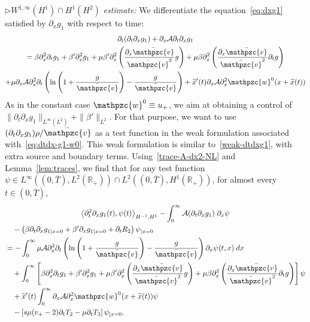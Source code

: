 \documentclass[AHL,Unicode,longabstracts,published]{cedram}
\newcommand{\R}{\mathbb{R}}
\newcommand{\p}{\partial}
\newcommand{\bv}{\bar{\mathpzc{v}}}
\newcommand{\cA}{\mathcal A}
\newcommand{\tw}{\mathpzc{w}}
\newcommand{\tx}{\widetilde{x}}
\newcommand{\tx}{\widetilde{x}}
\begin{document}
$\rhd W^{1,\infty}(H^1)\cap H^1(H^2)$ \emph{estimate:} We differentiate the equation~\eqref{eq:dxg1} satisfied by $\partial_x g_1$ with respect to time:
\begin{multline}\label{eq:dtdx-g1-w0}
\partial_t (\partial_t \partial_x g_1) + \partial_x \cA \partial_t \partial_x g_1 \\
= \beta \partial^2_x \partial_t g_1 + \beta'\partial^2_x g_1 + \mu \beta' \partial^2_x \left(\dfrac{\partial_x \bv}{\bv^2} g\right) + \mu \beta \partial^2_x \left(\dfrac{\partial_x \bv}{\bv^2} \partial_t g\right) \\
 + \mu \partial_x \cA \partial_x^2 \partial_t \left(\ln \left(1+ \dfrac{g}{\bv}\right) - \dfrac{g}{\bv} \right) + \tx'(t) \partial_x \cA \partial^2_x \tw^0(x + \tx(t))
\end{multline}
As in the constant case $\tw^0 \equiv u_+$, we aim at obtaining a control of $\|\partial_t \partial_x g_1\|_{L^\infty(L^2)} + \|\beta'\|_{L^2}$. For that purpose, we want to use $(\partial_t \partial_x g_1) \rho/\bv$ as a test function in the weak formulation associated with~\eqref{eq:dtdx-g1-w0}. This weak formulation is similar to~\eqref{weak-dtdxg1}, with extra source and boundary terms. Using~\eqref{trace-A-dx2-NL} and Lemma~\ref{lem:traces}, we find that for any test function $\psi\in L^\infty((0,\overline{T}), L^2(\R_+))\cap L^2((0,\overline{T}), H^1(\R_+))$, for almost every $t\in (0,\overline{T})$,
\begin{multline*}
\left\langle \p_t^2 \p_x g_1(t), \psi(t)\right\rangle_{H^{-1}, H^1} -\int_0^\infty \cA(\p_t\p_x g_1)\; \p_x \psi
\\
\begin{aligned}
&\quad -\left(\beta\p_t\p_x g_{1|x=0} + \beta' \p_xg_{1|x=0} + \p_t R_2\right)\psi_{|x=0}\\
&=-\int_0^\infty \mu \cA \p_x^2 \p_t \left(\ln \left(1+ \dfrac{g}{\bv}\right) - \dfrac{g}{\bv} \right) \p_x \psi(t,x)\:dx \\
&\quad +\int_0^\infty \left[\beta \p_x^2\p_t g_1 + \beta'\partial^2_x g_1 + \mu \beta' \partial^2_x \left(\dfrac{\partial_x \bv}{\bv^2} g\right) + \mu \beta \partial^2_x \left(\dfrac{\partial_x \bv}{\bv^2} \partial_t g\right) \right] \psi\\
&\quad + \tx'(t) \int_0^\infty\partial_x \cA \partial^2_x \tw^0(x + \tx(t)) \psi\\
&\quad -\left[s\mu (v_+-2)\p_t T_2 - \mu \p_t T_3\right] \psi_{|x=0}.
\end{aligned}
\end{multline*}
\end{document}
